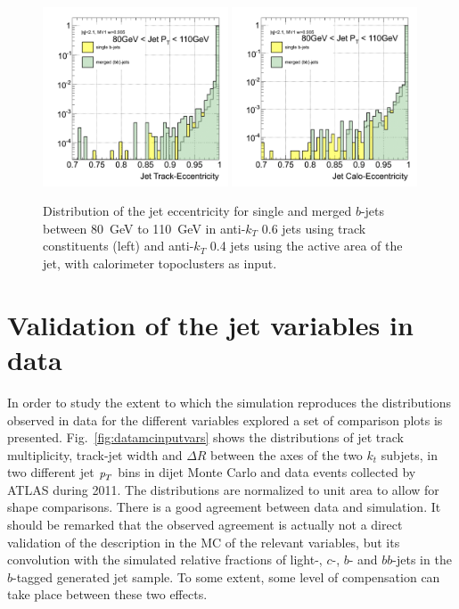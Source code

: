 \begin{figure}[tp]
\centering
\includegraphics[width=0.49\textwidth]{FIGS/TEMPFigs/Antikt6VarsSingleMerged/JetTrackEccentricity080.pdf}
\includegraphics[width=0.49\textwidth]{FIGS/TEMPFigs/GhostMatchingVarsClus/JetCaloEccentricity080.pdf}
\caption{Distribution of the jet eccentricity for single and merged $b$-jets between 80~GeV to 110~GeV in anti-$k_T$ 0.6 jets using track constituents (left) and anti-$k_T$ 0.4 jets using the active area of the jet, with calorimeter topoclusters as input.}
\label{fig:jeteccGhostAndAntikt6}
\end{figure}




\section{Validation of the jet variables in data}\label{sec:gbbValidation}

 In order to study the extent to which the simulation reproduces the distributions observed in data for the different variables explored a set of comparison plots is presented. Fig.~\ref{fig:datamcinputvars} shows the distributions of jet track multiplicity, track-jet width and $\Delta R$ between the axes of the two $k_t$ subjets, in two different jet ${\emph{p}_{T}}$ bins in dijet Monte Carlo and data events collected by ATLAS %
during 2011. The distributions are normalized to unit area to allow for shape comparisons. There is a good agreement between data and simulation. It should be remarked that the observed agreement is actually not a direct validation of the description in the MC of the relevant variables, but its convolution with the simulated relative fractions of light-, $c$-, $b$- and $bb$-jets in the $b$-tagged generated jet sample. To some extent, some level of compensation can take place between these two effects.

